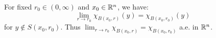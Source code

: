 \documentclass{../homework}
\begin{document}
\begin{problems}
\begin{problems}
    \begin{solution}
    \end{solution}

  \item For fixed \(r_0 \in (0, \infty)\) and \(x_0 \in \mathbb R^n\), we
    have:
    \[
      \lim_{r \to r_0} \chi_{B(x_0, r)}(y) = \chi_{B(x_0, r_0)}(y)
    \]
    for \(y \notin S(x_0, r_0)\).  Thus
    \(\lim_{r \to r_0} \chi_{B(x_0, r)} = \chi_{B(x_0, r_0)}\) a.e. in
    \(\mathbb R^n\).

    \begin{solution}
    \end{solution}

  \end{problems}

\end{problems}
\end{document}
